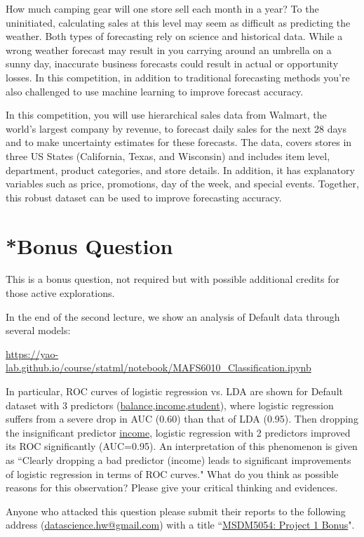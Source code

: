 \documentclass[11pt]{article}
\begin{document}
How much camping gear will one store sell each month in a year? To the uninitiated, calculating sales at this level may seem as difficult as predicting the weather. Both types of forecasting rely on science and historical data. While a wrong weather forecast may result in you carrying around an umbrella on a sunny day, inaccurate business forecasts could result in actual or opportunity losses. In this competition, in addition to traditional forecasting methods you're also challenged to use machine learning to improve forecast accuracy.

In this competition, you will use hierarchical sales data from Walmart, the world's largest company by revenue, to forecast daily sales for the next 28 days and to make uncertainty estimates for these forecasts. The data, covers stores in three US States (California, Texas, and Wisconsin) and includes item level, department, product categories, and store details. In addition, it has explanatory variables such as price, promotions, day of the week, and special events. Together, this robust dataset can be used to improve forecasting accuracy. 

\section{*Bonus Question}
This is a bonus question, not required but with possible additional credits for those active explorations.

In the end of the second lecture, we show an analysis of Default data through several models:   

\url{https://yao-lab.github.io/course/statml/notebook/MAFS6010\_Classification.ipynb} 

\noindent In particular, ROC curves of logistic regression vs. LDA are shown for Default dataset with 3 predictors (\url{balance},\url{income},\url{student}), where logistic regression suffers from a severe drop in AUC (0.60) than that of LDA (0.95). Then dropping the insignificant predictor \url{income}, logistic regression with 2 predictors improved its ROC significantly (AUC=0.95). An interpretation of this phenomenon is given as ``Clearly dropping a bad predictor (income) leads to significant improvements of logistic regression in terms of ROC curves." What do you think as possible reasons for this observation? Please give your critical thinking and evidences.


Anyone who attacked this question please submit their reports to the following address  (\href{mailto:datascience.hw@gmail.com}{datascience.hw@gmail.com}) with a title ``\underline{MSDM5054: Project 1 Bonus}".
\end{document}
